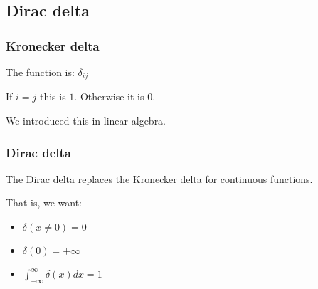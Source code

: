 
\subsection{Dirac delta}

\subsubsection{Kronecker delta}

The function is: \(\delta_{ij} \)

If \(i=j\) this is \(1\). Otherwise it is \(0\).

We introduced this in linear algebra.

\subsubsection{Dirac delta}

The Dirac delta replaces the Kronecker delta for continuous functions.

That is, we want:

\begin{itemize}
\item \(\delta (x\ne 0)=0\)
\item \(\delta (0)=+\infty\)
\item \(\int_{-\infty }^{\infty}\delta (x)dx=1\)
\end{itemize}

